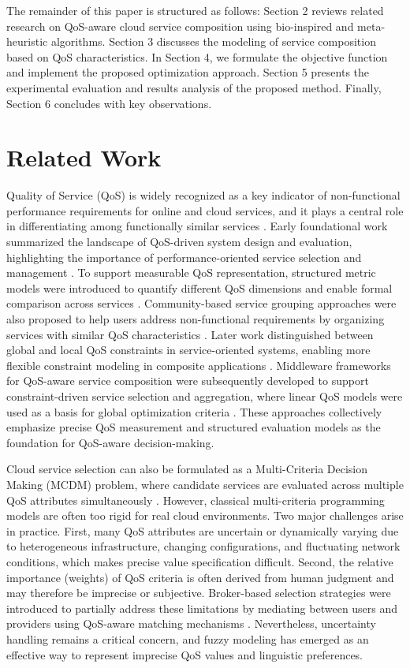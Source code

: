 \documentclass[3p,twocolumn]{elsarticle}
\theoremstyle{thmstyleone}%
\theoremstyle{thmstyletwo}%
\theoremstyle{thmstylethree}%
\begin{document}
The remainder of this paper is structured as follows: Section 2 reviews related research on QoS-aware cloud service composition using bio-inspired and meta-heuristic algorithms. Section 3 discusses the modeling of service composition based on QoS characteristics. In Section 4, we formulate the objective function and implement the proposed optimization approach. Section 5 presents the experimental evaluation and results analysis of the proposed method. Finally, Section 6 concludes with key observations.

 \section{Related Work}
 
 Quality of Service (QoS) is widely recognized as a key indicator of non-functional performance requirements for online and cloud services, and it plays a central role in differentiating among functionally similar services \cite{adacal2006mobile, liu2004qos}. Early foundational work summarized the landscape of QoS-driven system design and evaluation, highlighting the importance of performance-oriented service selection and management \cite{menasce2002qos}. To support measurable QoS representation, structured metric models were introduced to quantify different QoS dimensions and enable formal comparison across services \cite{ran2003model}. Community-based service grouping approaches were also proposed to help users address non-functional requirements by organizing services with similar QoS characteristics \cite{perryea2006community}. Later work distinguished between global and local QoS constraints in service-oriented systems, enabling more flexible constraint modeling in composite applications \cite{ardagna2005global}. Middleware frameworks for QoS-aware service composition were subsequently developed to support constraint-driven service selection and aggregation, where linear QoS models were used as a basis for global optimization criteria \cite{zeng2004qos}. These approaches collectively emphasize precise QoS measurement and structured evaluation models as the foundation for QoS-aware decision-making.

Cloud service selection can also be formulated as a Multi-Criteria Decision Making (MCDM) problem, where candidate services are evaluated across multiple QoS attributes simultaneously \cite{youssef2020integrated, kumar2021ccs}. However, classical multi-criteria programming models are often too rigid for real cloud environments. Two major challenges arise in practice. First, many QoS attributes are uncertain or dynamically varying due to heterogeneous infrastructure, changing configurations, and fluctuating network conditions, which makes precise value specification difficult. Second, the relative importance (weights) of QoS criteria is often derived from human judgment and may therefore be imprecise or subjective. Broker-based selection strategies were introduced to partially address these limitations by mediating between users and providers using QoS-aware matching mechanisms \cite{d2008qos}. Nevertheless, uncertainty handling remains a critical concern, and fuzzy modeling has emerged as an effective way to represent imprecise QoS values and linguistic preferences.
\end{document}
